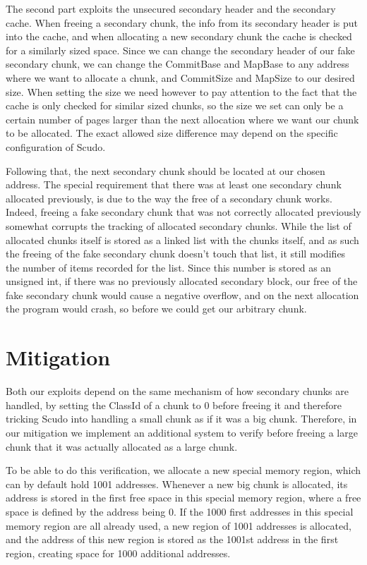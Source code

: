 \documentclass[a4paper,11pt,oneside]{report}
\begin{document}
The second part exploits the unsecured secondary header and the secondary cache. When
freeing a secondary chunk, the info from its secondary header is put into the cache, and
when allocating a new secondary chunk the cache is checked for a similarly sized
space. Since we can change the secondary header of our fake secondary chunk, we can change
the CommitBase and MapBase to any address where we want to allocate a chunk, and
CommitSize and MapSize to our desired size. When setting the size we need however to pay
attention to the fact that the cache is only checked for similar sized chunks, so the size
we set can only be a certain number of pages larger than the next allocation where we want
our chunk to be allocated. The exact allowed size difference may depend on the specific
configuration of Scudo.

Following that, the next secondary chunk should be located at our chosen address. The
special requirement that there was at least one secondary chunk allocated previously, is
due to the way the free of a secondary chunk works. Indeed, freeing a fake secondary chunk
that was not correctly allocated previously somewhat corrupts the tracking of allocated
secondary chunks. While the list of allocated chunks itself is stored as a linked list
with the chunks itself, and as such the freeing of the fake secondary chunk doesn't touch
that list, it still modifies the number of items recorded for the list. Since this number
is stored as an unsigned int, if there was no previously allocated secondary block, our
free of the fake secondary chunk would cause a negative overflow, and on the next
allocation the program would crash, so before we could get our arbitrary chunk.


\chapter{Mitigation}

Both our exploits depend on the same mechanism of how secondary chunks are handled, by setting
the ClassId of a chunk to 0 before freeing it and therefore tricking Scudo into handling a
small chunk as if it was a big chunk. 
Therefore, in our mitigation we implement an
additional system to verify before freeing a large chunk that it was actually allocated as
a large chunk.

To be able to do this verification, we allocate a new special memory region, which can by
default hold 1001 addresses. Whenever a new big chunk is allocated, its address is stored
in the first free space in this special memory region, where a free space is defined by
the address being 0. If the 1000 first addresses in this special memory region are all
already used, a new region of 1001 addresses is allocated, and the address of this new
region is stored as the 1001st address in the first region, creating space for 1000
additional addresses. 
\end{document}
